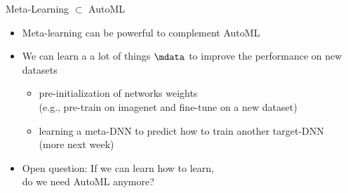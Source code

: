 \begin{frame}[c]{Meta-Learning $\subset$ AutoML}

\begin{itemize}
	\item Meta-learning can be powerful to complement AutoML
	\pause
	\medskip
	\item We can learn a a lot of things $\mdata$ to improve the performance on new datasets
	\begin{itemize}
		\item pre-initialization of networks weights\\
		(e.g., pre-train on imagenet and fine-tune on a new dataset)
		\item learning a meta-DNN to predict how to train another target-DNN\\
		(more next week)
	\end{itemize}
	\pause
	\medskip
	\item Open question: If we can learn how to learn,\\ do we need AutoML anymore?
\end{itemize}

\end{frame}
